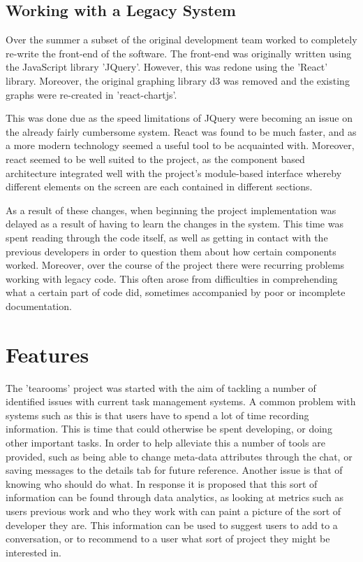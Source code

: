 \documentclass{l4proj}
\begin{document}
\section{Working with a Legacy System}

Over the summer a subset of the original development team worked to completely re-write the front-end of the software.  The front-end was originally written using the JavaScript library 'JQuery'.  However, this was redone using the 'React' library.  Moreover, the original graphing library d3 was removed and the existing graphs were re-created in 'react-chartjs'.

This was done due as the speed limitations of JQuery were becoming an issue on the already fairly cumbersome system.  React was found to be much faster, and as a more modern technology seemed a useful tool to be acquainted with.  Moreover, react seemed to be well suited to the project, as the component based architecture integrated well with the project's module-based interface whereby different elements on the screen are each contained in different sections.

As a result of these changes, when beginning the project implementation was delayed as a result of having to learn the changes in the system.  This time was spent reading through the code itself, as well as getting in contact with the previous developers in order to question them about how certain components worked.  Moreover, over the course of the project there were recurring problems working with legacy code.  This often arose from difficulties in comprehending what a certain part of code did, sometimes accompanied by poor or incomplete documentation.

\chapter{Features}

The 'tearooms' project was started with the aim of tackling a number of identified issues with current task management systems. A common problem with systems such as this is that users have to spend a lot of time recording information.  This is time that could otherwise be spent developing, or doing other important tasks.  In order to help alleviate this a number of tools are provided, such as being able to change meta-data attributes through the chat, or saving messages to the details tab for future reference.   Another issue is that of knowing who should do what.  In response it is proposed that this sort of information can be found through data analytics, as looking at metrics such as users previous work and who they work with can paint a picture of the sort of developer they are.  This information can be used to suggest users to add to a conversation, or to recommend to a user what sort of project they might be interested in.
\end{document}
